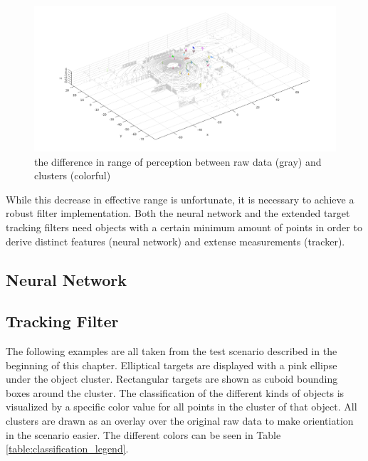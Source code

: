 \begin{figure}[H]
\centering
\includegraphics[width = \textwidth]{include/images/results_comp_dist_raw_cluster.png}
\caption{the difference in range of perception between raw data (gray) and clusters (colorful)}
\label{fig:comp_dist_raw_cluster}
\end{figure}

While this decrease in effective range is unfortunate, it is necessary to achieve a robust filter implementation. Both the neural network and the extended target tracking filters need objects with a certain minimum amount of points in order to derive distinct features (neural network) and extense measurements (tracker).

\subsection{Neural Network}

\subsection{Tracking Filter}

The following examples are all taken from the test scenario described in the beginning of this chapter. Elliptical targets are displayed with a pink ellipse under the object cluster. Rectangular targets are shown as cuboid bounding boxes around the cluster. The classification of the different kinds of objects is visualized by a specific color value for all points in the cluster of that object. All clusters are drawn as an overlay over the original raw data to make orientiation in the scenario easier. The different colors can be seen in Table \ref{table:classification_legend}.

